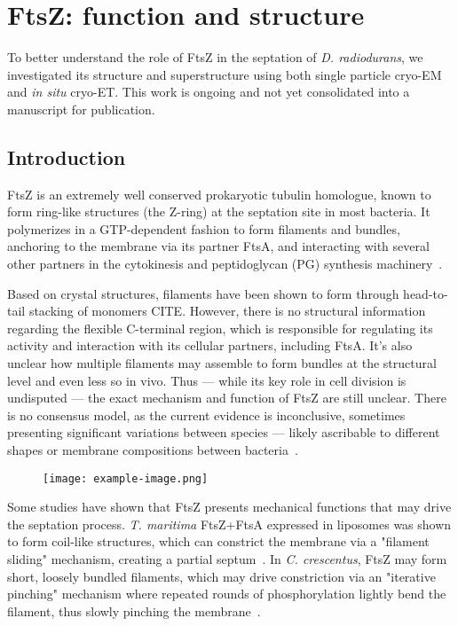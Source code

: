 \chapter{FtsZ: function and structure}\label{ftsz}

To better understand the role of FtsZ in the septation of \textit{D. radiodurans}, we investigated its structure and superstructure using both single particle cryo-EM and \textit{in situ} cryo-ET.
This work is ongoing and not yet consolidated into a manuscript for publication.

\localtableofcontents

\section{Introduction}

FtsZ is an extremely well conserved prokaryotic tubulin homologue, known to form ring-like structures (the Z-ring) at the septation site in most bacteria.
It polymerizes in a GTP-dependent fashion to form filaments and bundles, anchoring to the membrane via its partner FtsA, and interacting with several other partners in the cytokinesis and peptidoglycan (PG) synthesis machinery~\cite{barrowsFtsZDynamicsBacterial2021,mcquillenInsightsStructureFunction2020}.

Based on crystal structures, filaments have been shown to form through head-to-tail stacking of monomers CITE.
However, there is no structural information regarding the flexible C-terminal region, which is responsible for regulating its activity and interaction with its cellular partners, including FtsA.
It's also unclear how multiple filaments may assemble to form bundles at the structural level and even less so in vivo.
Thus --- while its key role in cell division is undisputed --- the exact mechanism and function of FtsZ are still unclear.
There is no consensus model, as the current evidence is inconclusive, sometimes presenting significant variations between species --- likely ascribable to different shapes or membrane compositions between bacteria~\cite{barrowsFtsZDynamicsBacterial2021,mcquillenInsightsStructureFunction2020}.

\begin{figure}[ht]
    \centering
    \texttt{[image: example-image.png]}
    \label{fig:ftsz_ring}
\end{figure}

Some studies have shown that FtsZ presents mechanical functions that may drive the septation process.
\textit{T. maritima} FtsZ+FtsA expressed in liposomes was shown to form coil-like structures, which can constrict the membrane via a "filament sliding" mechanism, creating a partial septum~\cite{szwedziakArchitectureRingFormed2014}.
In \textit{C. crescentus}, FtsZ may form short, loosely bundled filaments, which may drive constriction via an "iterative pinching" mechanism where repeated rounds of phosphorylation lightly bend the filament, thus slowly pinching the membrane~\cite{liStructureFtsZFilaments2007}.

